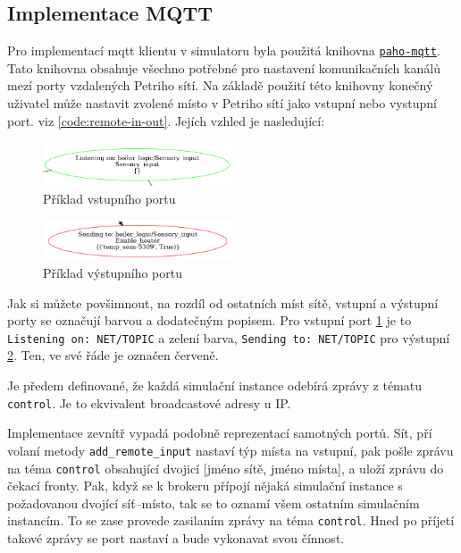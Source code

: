 \subsection{Implementace MQTT}
\label{subsec:mqtt_impl}
Pro implementací mqtt klientu v simulatoru byla použitá knihovna \href{https://pypi.org/project/paho-mqtt/}{\texttt{paho-mqtt}}. Tato knihovna obsahuje všechno potřebné pro nastavení komunikačních kanálů mezí porty vzdalených Petriho sítí. Na základě použití této knihovny konečný uživatel může nastavit zvolené místo v Petriho sítí jako vstupní nebo vystupní port. viz \ref{code:remote-in-out}. Jejích vzhled je nasledující:
\begin{figure}[hbt]
  \centering
  \includegraphics[width=0.5\textwidth]{obrazky-figures/port-in.png}
  \caption{Příklad vstupního portu}
  \label{port-in}
\end{figure}

\begin{figure}[hbt]
  \centering
  \includegraphics[width=0.5\textwidth]{obrazky-figures/port-out.png}
  \caption{Příklad výstupního portu}
  \label{port-out}
\end{figure}

Jak si můžete povšimnout, na rozdíl od ostatních míst sítě, vstupní a výstupní porty se označují barvou a dodatečným popisem. Pro vstupní port \ref{port-in} je to \texttt{Listening on: NET/TOPIC} a zelení barva, \texttt{Sending to: NET/TOPIC} pro výstupní \ref{port-out}. Ten, ve své řáde je označen červeně.

Je předem definované, že každá simulační instance odebírá zprávy z tématu \texttt{control}. Je to ekvivalent broadcastové adresy u IP.

Implementace zevnítř vypadá podobně reprezentací samotných portů. Sít, pří volaní metody \texttt{add\_remote\_input} nastaví týp místa na vstupní, pak pošle zprávu na téma \texttt{control} obsahující dvojicí [jméno sítě, jméno místa], a uloží zprávu do čekací fronty. Pak, když se k brokeru přípojí nějaká simulační instance s požadovanou dvojící síť--místo, tak se to oznamí všem ostatním simulačním instancím. To se zase provede zasilaním zprávy na téma \texttt{control}. Hned po příjetí takové zprávy se port nastaví a bude vykonavat svou čínnost.

